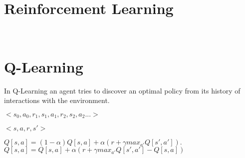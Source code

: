 \section{Reinforcement Learning}\label{reinforcement learning}
~\cite{barto1998reinforcement}
\section{Q-Learning}\label{qlearning}
In Q-Learning an agent tries to discover an optimal policy from its history of interactions with the environment.
\begin{center}
$<s_{0},a_{0},r_{1},s_{1},a_{1},r_{2},s_{2},a_{2}...>$
\end{center}

\begin{center}
$<s,a,r,s'>$
\end{center}

\begin{center}
$Q[s,a] = (1-\alpha) Q[s,a] + \alpha(r+ {\gamma}max_{a'} Q[s',a']).$
$Q[s,a] = Q[s,a] + {\alpha}(r+ {\gamma}max_{a'} Q[s',a'] - Q[s,a])$
\end{center}
~\cite{poole2010artificial}